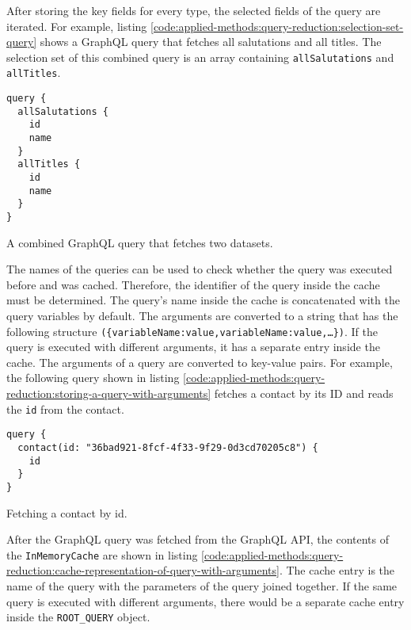 After storing the key fields for every type, the selected fields of the query are iterated. For example, listing \ref{code:applied-methods:query-reduction:selection-set-query} shows a GraphQL query that fetches all salutations and all titles. The selection set of this combined query is an array containing \texttt{allSalutations} and \texttt{allTitles}.

\ifshowListings
\begin{listing}[H]
\begin{verbatim}
query {
  allSalutations {
    id
    name
  }
  allTitles {
    id
    name
  }
}
\end{verbatim}
\caption{A combined GraphQL query that fetches two datasets.}\label{code:applied-methods:query-reduction:selection-set-query}
\end{listing}
\fi

\noindent The names of the queries can be used to check whether the query was executed before and was cached. Therefore, the identifier of the query inside the cache must be determined. The query's name inside the cache is concatenated with the query variables by default. The arguments are converted to a string that has the following structure \texttt{(\{variableName:value,variableName:value,\dots\})}. If the query is executed with different arguments, it has a separate entry inside the cache. The arguments of a query are converted to key-value pairs. For example, the following query shown in listing \ref{code:applied-methods:query-reduction:storing-a-query-with-arguments} fetches a contact by its \ac{ID} and reads the \texttt{id} from the contact.

\ifshowListings
\begin{listing}[H]
\begin{verbatim}
query {
  contact(id: "36bad921-8fcf-4f33-9f29-0d3cd70205c8") {
    id
  }
}
\end{verbatim}
\caption{Fetching a contact by id.}\label{code:applied-methods:query-reduction:storing-a-query-with-arguments}
\end{listing}
\fi

\noindent After the GraphQL query was fetched from the GraphQL \ac{API}, the contents of the \texttt{InMemoryCache} are shown in listing \ref{code:applied-methods:query-reduction:cache-representation-of-query-with-arguments}. The cache entry is the name of the query with the parameters of the query joined together. If the same query is executed with different arguments, there would be a separate cache entry inside the \texttt{ROOT\_QUERY} object.

